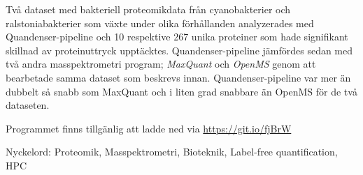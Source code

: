 Två dataset med bakteriell proteomikdata från cyanobakterier och ralstoniabakterier som växte under olika förhållanden analyzerades med Quandenser-pipeline och 10 respektive 267 unika proteiner som hade signifikant skillnad av proteinuttryck upptäcktes. Quandenser-pipeline jämfördes sedan med två andra masspektrometri program; \textit{MaxQuant} och \textit{OpenMS} genom att bearbetade samma dataset som beskrevs innan. Quandenser-pipeline var mer än dubbelt så snabb som MaxQuant och i liten grad snabbare än OpenMS för de två dataseten.

Programmet finns tillgänlig att ladde ned via \url{https://git.io/fjBrW}

\vspace{2cm}

Nyckelord: Proteomik, Masspektrometri, Bioteknik, Label-free quantification, HPC
